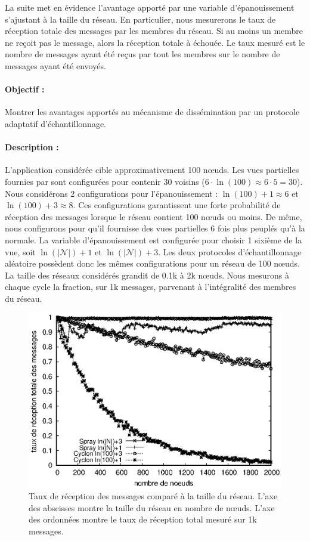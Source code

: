 La suite met en évidence l'avantage apporté par une variable d'épanouissement
s'ajustant à la taille du réseau. En particulier, nous mesurerons le taux de
réception totale des messages par les membres du réseau. Si au moins un membre
ne reçoit pas le message, alors la réception totale à échouée. Le taux mesuré
est le nombre de messages ayant été reçus par tout les membres sur le nombre de
messages ayant été envoyés.

\paragraph{Objectif :} Montrer les avantages apportés au mécanisme de
dissémination par un protocole adaptatif d'échantillonnage.

\paragraph{Description :} L'application considérée cible approximativement 100
nœuds. Les vues partielles fournies par \CYCLON sont configurées pour contenir
30 voisins ($6 \cdot \ln(100) \approx 6 \cdot 5 = 30$). Nous considérons 2
configurations pour l'épanouissement : $\ln(100)+1 \approx 6$ et
$\ln(100)+3 \approx 8$. Ces configurations garantissent une forte probabilité de
réception des messages lorsque le réseau contient 100 nœuds ou moins. De même,
nous configurons \SPRAY pour qu'il fournisse des vues partielles 6 fois plus
peuplés qu'à la normale. La variable d'épanouissement est configurée pour
choisir 1 sixième de la vue, soit $\ln(|\mathcal{N}|)+1$ et
$\ln(|\mathcal{N}|)+3$.  Les deux protocoles d'échantillonnage aléatoire
possèdent donc les mêmes configurations pour un réseau de 100 nœuds. La taille
des réseaux considérés grandit de 0.1k à 2k nœuds. Nous mesurons à chaque cycle
la fraction, sur 1k messages, parvenant à l'intégralité des membres du réseau.

\begin{figure}
  \begin{center}
    \includegraphics[width=.8\textwidth]{img/spray/hardrate.eps}
    \caption[Taux de réception des messages comparé à la taille du
    réseau.]{\label{net:fig:hardrate} Taux de réception des messages comparé à
      la taille du réseau. L'axe des abscisses montre la taille du réseau en
      nombre de nœuds. L'axe des ordonnées montre le taux de réception total
      mesuré sur 1k messages.}
  \end{center}
\end{figure}

